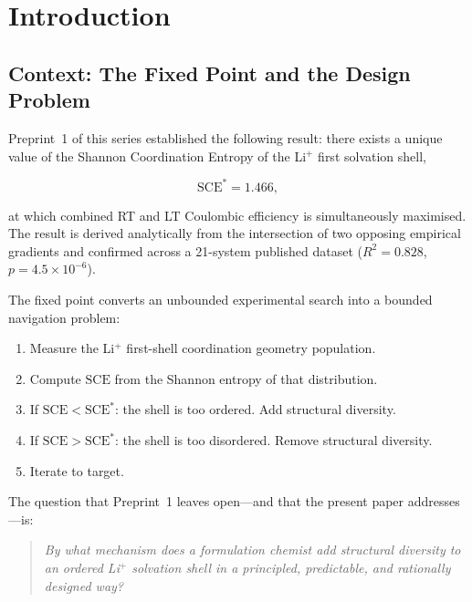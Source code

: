 \documentclass[11pt]{article}
\theoremstyle{plain}
\theoremstyle{definition}
\theoremstyle{remark}
\begin{document}
\tableofcontents
\newpage

\section{Introduction}

\subsection{Context: The Fixed Point and the Design Problem}

Preprint~1 of this series established the following result: there exists a
unique value of the Shannon Coordination Entropy of the Li$^+$ first
solvation shell,

\begin{equation}
  \mathrm{SCE}^{*} = 1.466,
  \label{eq:fixed_point}
\end{equation}

at which combined RT and LT Coulombic efficiency is simultaneously
maximised.  The result is derived analytically from the intersection of
two opposing empirical gradients and confirmed across a 21-system published
dataset ($R^2 = 0.828$, $p = 4.5 \times 10^{-6}$).

The fixed point converts an unbounded experimental search into a bounded
navigation problem:

\begin{enumerate}[leftmargin=2em]
  \item Measure the Li$^+$ first-shell coordination geometry population.
  \item Compute $\mathrm{SCE}$ from the Shannon entropy of that
        distribution.
  \item If $\mathrm{SCE} < \mathrm{SCE}^{*}$: the shell is too ordered.
        Add structural diversity.
  \item If $\mathrm{SCE} > \mathrm{SCE}^{*}$: the shell is too disordered.
        Remove structural diversity.
  \item Iterate to target.
\end{enumerate}

The question that Preprint~1 leaves open---and that the present paper
addresses---is:

\begin{quote}
\itshape By what mechanism does a formulation chemist add structural
diversity to an ordered Li$^+$ solvation shell in a principled,
predictable, and rationally designed way?
\end{quote}
\end{document}

